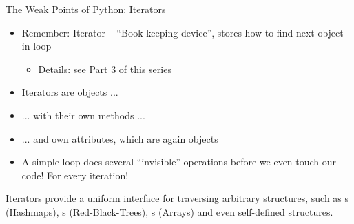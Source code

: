 \begin{frame}[fragile]{The Weak Points of Python: Iterators}
%
\begin{itemize}
\item Remember: Iterator -- \enquote{Book keeping device}, stores how to find next object in loop
	\begin{itemize}
	\item Details: see Part 3 of this series
	\end{itemize}
\item Iterators are objects ...
\item ... with their own methods ...
\item ... and own attributes, which are again objects
\item[\Thus] A simple  loop does several \enquote{invisible} operations before we even touch our code! For every iteration!
\end{itemize}
%
\begin{hintbox}
Iterators provide a uniform interface for traversing arbitrary structures, such as s (Hashmaps), s (Red-Black-Trees), s (Arrays) and even self-defined structures.
\end{hintbox}
%
\end{frame}


